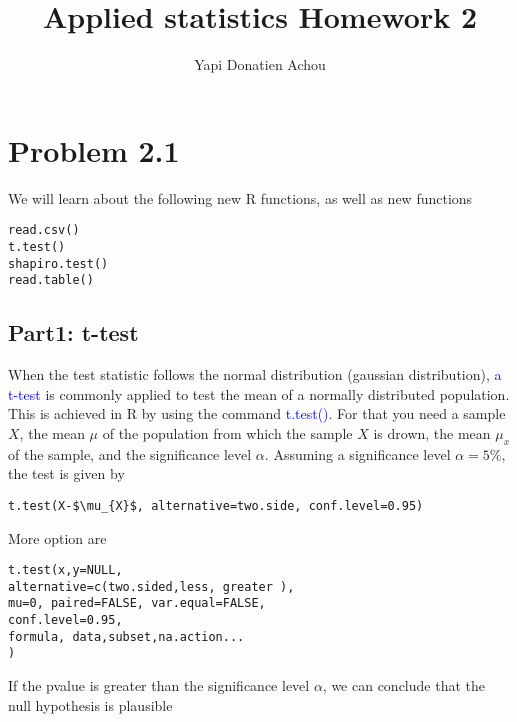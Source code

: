 \documentclass[11pt, oneside]{article}   	%
\title{Applied statistics Homework 2}
\author{Yapi Donatien Achou}
\begin{document}
\maketitle
\tableofcontents
\newpage
 
\section{Problem 2.1}
We will learn about the following new R functions, as well as new functions
\begin{lstlisting}
read.csv()
t.test()
shapiro.test()
read.table()
\end{lstlisting}
\subsection{Part1: t-test}
When the test statistic follows the normal distribution (gaussian distribution), \textcolor{blue}{a t-test} is commonly applied to test the mean of a normally distributed population. This is achieved in R by using the command \textcolor{blue}{t.test()}. For that you need a sample $X$, the mean $\mu$ of the population from which the sample $X$ is drown, the mean $\mu_{x}$
of the sample, and the significance level $\alpha$. Assuming a significance level $\alpha=5\%$, the test is given by
\begin{lstlisting}[mathescape=true]
t.test(X-$\mu_{X}$, alternative=two.side, conf.level=0.95)
\end{lstlisting}
More option are 
\begin{lstlisting}[mathescape=true]
t.test(x,y=NULL,
alternative=c(two.sided,less, greater ),
mu=0, paired=FALSE, var.equal=FALSE,
conf.level=0.95,
formula, data,subset,na.action...
)
\end{lstlisting}
If the pvalue is greater than the significance level $\alpha$, we can conclude that the null hypothesis is plausible
\end{document}
